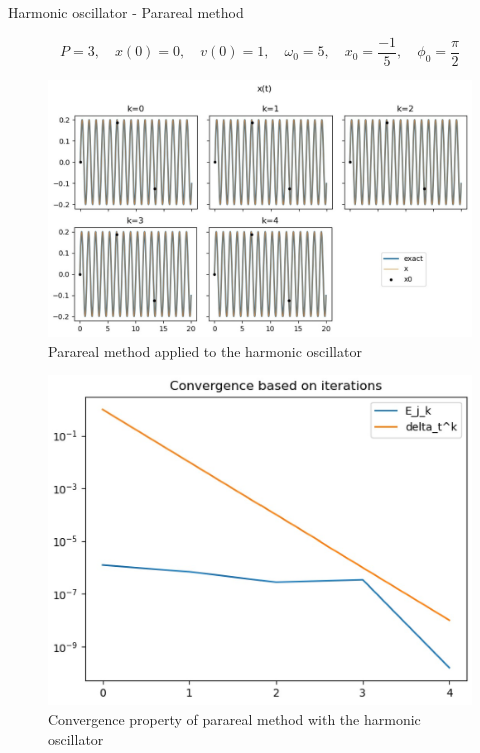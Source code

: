 	\begin{frame}{Harmonic oscillator - Parareal method}
	
	$$P=3, \quad x(0)=0,\quad v(0)=1, \quad\omega_0=5, \quad x_0=\frac{-1}{5}, \quad \phi_0=\frac{\pi}{2}$$
	
	\begin{minipage}{0.6\linewidth}
		\begin{figure}
			\centering
			\includegraphics[width=\linewidth]{"images/parareal/osci_1.jpg"}
			\caption{Parareal method applied to the harmonic oscillator}
		\end{figure}
	\end{minipage} \;
	\begin{minipage}{0.38\linewidth}
		\begin{figure}
			\centering
			\includegraphics[width=\linewidth]{"images/parareal/osci_cvg_1.jpg"}
			\caption{Convergence property of parareal method with the harmonic oscillator}
		\end{figure}
	\end{minipage}
	
\end{frame}


